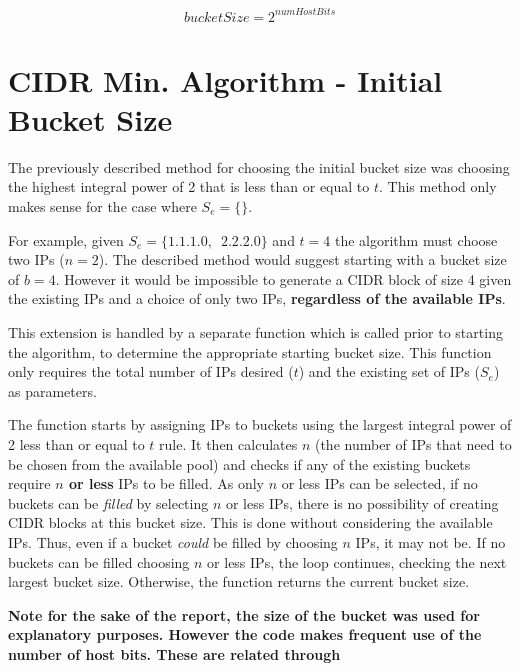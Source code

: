 \begin{appendices}
\begin{equation}\label{eq:bucketSizeHostBits1}
bucketSize = 2^{numHostBits}
\end{equation}
\vfill




\chapter{CIDR Min. Algorithm - Initial Bucket Size}
\label{appendix:smartInitBucket}
The previously described method for choosing the initial bucket size was choosing the highest integral power of 2 that is less than or equal to $t$. This method only makes sense for the case where $S_e = \{\}$. 

For example, given $S_e = \{1.1.1.0,\enspace2.2.2.0\}$ and $t = 4$ the algorithm must choose two IPs ($n = 2$). The described method would suggest starting with a bucket size of $b=4$. However it would be impossible to generate a CIDR block of size 4 given the existing IPs and a choice of only two IPs, \textbf{regardless of the available IPs}. 

This extension is handled by a separate function which is called prior to starting the algorithm, to determine the appropriate starting bucket size. This function only requires the total number of IPs desired ($t$) and the existing set of IPs ($S_e$) as parameters. 

The function starts by assigning IPs to buckets using the largest integral power of 2 less than or equal to $t$ rule. It then calculates $n$ (the number of IPs that need to be chosen from the available pool) and checks if any of the existing buckets require \textbf{$n$ or less} IPs to be filled. As only $n$ or less IPs can be selected, if no buckets can be \textit{filled} by selecting $n$ or less IPs, there is no possibility of creating CIDR blocks at this bucket size. This is done without considering the available IPs. Thus, even if a bucket \textit{could} be filled by choosing $n$ IPs, it may not be. If no buckets can be filled choosing $n$ or less IPs, the loop continues, checking the next largest bucket size. Otherwise, the function returns the current bucket size.

\textbf{Note for the sake of the report, the size of the bucket was used for explanatory purposes. However the code makes frequent use of the number of host bits. These are related through }


\end{appendices}
